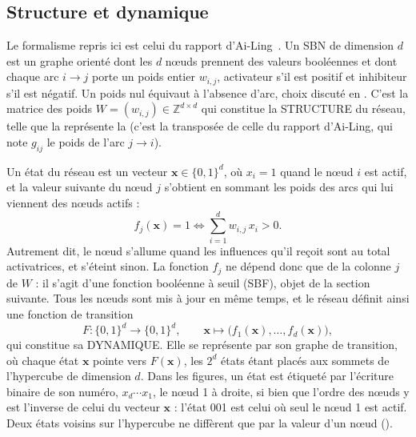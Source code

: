 \documentclass[12pt, a4paper]{article}
\begin{document}
\subsection{Structure et dynamique}
\label{sec:structure-dynamique}

Le formalisme repris ici est celui du rapport d'Ai-Ling~\cite{bonnet2023}.
Un SBN de dimension $d$ est un graphe orienté dont les $d$ nœuds prennent des valeurs booléennes et dont chaque arc $i \to j$ porte un poids entier $w_{i,j}$, activateur s'il est positif et inhibiteur s'il est négatif.
Un poids nul équivaut à l'absence d'arc, choix discuté en .
C'est la matrice des poids $W = (w_{i,j}) \in \mathbb{Z}^{d \times d}$ qui constitue la STRUCTURE du réseau, telle que la représente la  (c'est la transposée de celle du rapport d'Ai-Ling, qui note $g_{ij}$ le poids de l'arc $j \to i$).

Un état du réseau est un vecteur $\mathbf{x} \in \{0,1\}^d$, où $x_i = 1$ quand le nœud $i$ est actif, et la valeur suivante du nœud $j$ s'obtient en sommant les poids des arcs qui lui viennent des nœuds actifs :
\begin{equation}
f_j(\mathbf{x}) = 1 \iff \sum_{i=1}^{d} w_{i,j}\, x_i > 0 .
\end{equation}
Autrement dit, le nœud s'allume quand les influences qu'il reçoit sont au total activatrices, et s'éteint sinon.
La fonction $f_j$ ne dépend donc que de la colonne $j$ de $W$ : il s'agit d'une fonction booléenne à seuil (SBF), objet de la section suivante.
Tous les nœuds sont mis à jour en même temps, et le réseau définit ainsi une fonction de transition
\begin{equation}
F : \{0,1\}^d \to \{0,1\}^d, \qquad \mathbf{x} \mapsto \big(f_1(\mathbf{x}), \dots, f_d(\mathbf{x})\big),
\end{equation}
qui constitue sa DYNAMIQUE.
Elle se représente par son graphe de transition, où chaque état $\mathbf{x}$ pointe vers $F(\mathbf{x})$, les $2^d$ états étant placés aux sommets de l'hypercube de dimension $d$.
Dans les figures, un état est étiqueté par l'écriture binaire de son numéro, $x_d \cdots x_1$, le nœud 1 à droite, si bien que l'ordre des nœuds y est l'inverse de celui du vecteur $\mathbf{x}$ : l'état 001 est celui où seul le nœud 1 est actif.
Deux états voisins sur l'hypercube ne diffèrent que par la valeur d'un nœud ().
\end{document}
